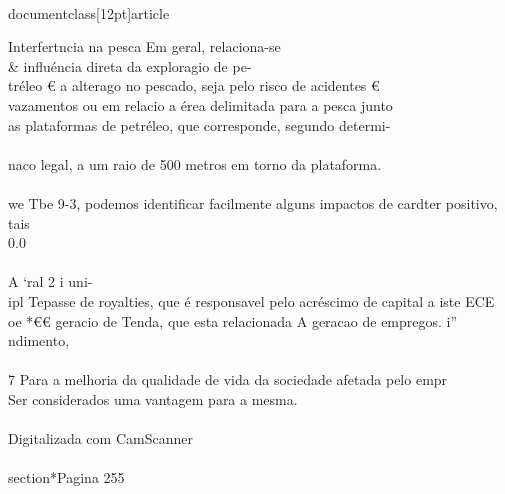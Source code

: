 \\documentclass[12pt]{article}
\begin{document}
Interfertncia na pesca Em geral, relaciona-se \\& influéncia direta da exploragio de pe-\\
tréleo € a alterago no pescado, seja pelo risco de acidentes €\\
vazamentos ou em relacio a érea delimitada para a pesca junto\\
as plataformas de petréleo, que corresponde, segundo determi-\\
\\
naco legal, a um raio de 500 metros em torno da plataforma.\\
\\
we Tbe 9-3, podemos identificar facilmente alguns impactos de cardter positivo, tais\\
0.0\\
\\
A ‘ral 2 i uni-\\
ipl Tepasse de royalties, que é responsavel pelo acréscimo de capital a iste ECE\\
oe *€€ geracio de Tenda, que esta relacionada A geracao de empregos. i” ndimento,\\
\\
7 Para a melhoria da qualidade de vida da sociedade afetada pelo empr\\
Ser considerados uma vantagem para a mesma.\\
\\
Digitalizada com CamScanner\\

\\section*{Pagina 255}
\end{document}
